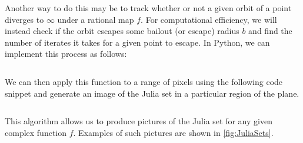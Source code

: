 \documentclass{amsart}
\theoremstyle{definition}
\theoremstyle{remark}
\numberwithin{equation}{section}
\begin{document}
Another way to do this may be to track whether or not a given orbit of a point diverges to $\infty$ under a rational map $f$. For computational efficiency, we will instead check if the orbit escapes some bailout (or escape) radius $b$ and find the number of iterates it takes for a given point to escape. In Python, we can implement this process as follows:

\inputminted[mathescape]{python}{code-snippets/Julia.py}

We can then apply this function to a range of pixels using the following code snippet and generate an image of the Julia set in a particular region of the plane.

\inputminted[mathescape]{python}{code-snippets/Julia_Set.py}

This algorithm allows us to produce pictures of the Julia set for any given complex function $f$. Examples of such pictures are shown in \cref{fig:JuliaSets}.
\end{document}

